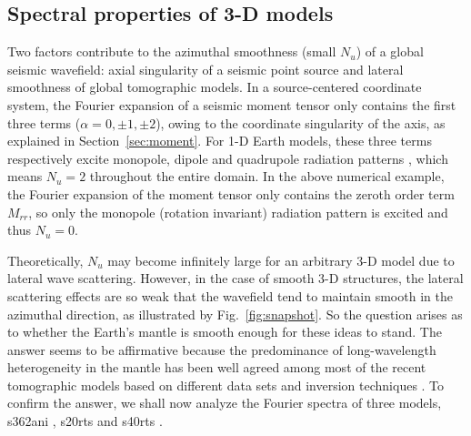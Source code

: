\documentclass[extra,referee]{gji}
\begin{document}
\subsection{Spectral properties of 3-D models}
Two factors contribute to the azimuthal smoothness (small $N_u$) of 
a global seismic wavefield: axial singularity of a seismic point source 
and lateral smoothness of global tomographic models.  
In a source-centered coordinate system, the Fourier expansion 
of a seismic moment tensor only contains the first three terms 
($\alpha=0,\pm1,\pm2$), owing to the coordinate singularity 
of the axis, as explained in Section~\ref{sec:moment}.
For 1-D Earth models, these three terms respectively
excite monopole, dipole and quadrupole radiation patterns
\cite[]{nissen2007axisem, van2014seismic}, which means $N_u=2$ throughout 
the entire domain. In the above numerical example, the Fourier expansion of
the moment tensor only contains the zeroth order term $M_{rr}$, 
so only the monopole (rotation invariant) radiation pattern is excited 
and thus $N_u=0$.

Theoretically, $N_u$ may become infinitely large for an arbitrary 3-D model 
due to lateral wave scattering. However, in the case of smooth 3-D structures, 
the lateral scattering effects are so weak that  
the wavefield tend to maintain smooth in the azimuthal direction, as
illustrated by Fig.~\ref{fig:snapshot}. 
So the question arises as to whether the Earth's mantle is 
smooth enough for these ideas to stand. 
The answer seems to be affirmative because
the predominance of long-wavelength heterogeneity in the mantle 
\cite[]{su1991predominance} has been well agreed among
most of the recent tomographic models based on different data 
sets and inversion techniques \cite[]{becker2002comparison}.
To confirm the answer, we shall now analyze the Fourier spectra of 
three models, s362ani \cite[]{kustowski2008s362ani}, 
s20rts \cite[]{ritsema1999s20rts} and 
s40rts \cite[]{ritsema2011s40rts}.
\end{document}
